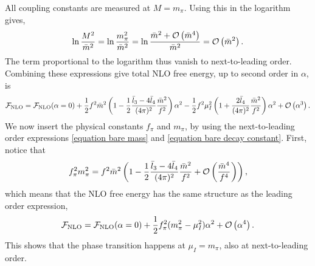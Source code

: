 All coupling constants are measured at $M = m_\pi$.
Using this in the logarithm gives,
\begin{equation}
    \ln \frac{M^2}{\bar m^2}
    = \ln \frac{m_\pi^2}{\bar m^2}
    = \ln \frac{\bar m^2 + \Oh[4]{\bar m} }{\bar m^2}
    = \Oh[2]{\bar m}.
\end{equation}
The term proportional to the logarithm thus vanish to next-to-leading order.
Combining these expressions give total NLO free energy, up to second order in $\alpha$, is
\begin{equation}
    \Ef_{\mathrm{NLO}}
    =
    \Ef_{\mathrm{NLO}}(\alpha = 0)
    +
    \frac{1}{2} f^2 \bar m^2
    \left(
        1
        -
        \frac{1}{2}
        \frac{\bar l_3 - 4 \bar l_4}{(4 \pi)^2} \frac{\bar m^2}{f^2}
    \right)\alpha^2
    - \frac{1}{2}f^2 \mu_I^2
    \left(
        1
        +
        \frac{2 \bar l_4}{(4 \pi)^2}
        \frac{\bar m^2}{f^2}
    \right) \alpha^2
    + \Oh[3]{\alpha}.
\end{equation}
We now insert the physical constants $f_\pi$ and $m_\pi$, by using the next-to-leading order expressions \cref{equation bare mass} and \cref{equation bare decay constant}.
First, notice that
\begin{equation}
    f_\pi^2 m_\pi^2
    = f^2 \bar m^2
    \left(
        1 - \frac{1}{2} \frac{\bar l_3 - 4 \bar l_4}{(4 \pi)^2} \frac{\bar m^2}{f^2}
        +
        \Oh[]{\frac{\bar m^4}{f^4}}
    \right),
\end{equation}
which means that the NLO free energy has the same structure as the leading order expression,
\begin{equation}
    \Ef_{\mathrm{NLO}}
    =
    \Ef_{\mathrm{NLO}}(\alpha = 0)
    + \frac{1}{2}f_\pi^2 (m_\pi^2 - \mu_I^2 )\alpha^2
    + \Oh[4]{\alpha}.
\end{equation}
This shows that the phase transition happens at $\mu_I = m_\pi$, also at next-to-leading order.


